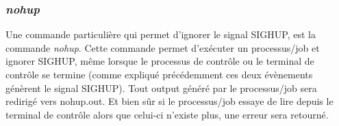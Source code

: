 \subsubsection{\textit{nohup}}
Une commande particulière qui permet d’ignorer le signal SIGHUP, est la commande \textit{nohup}. Cette commande permet d’exécuter un processus/job et ignorer SIGHUP, même lorsque le processus de contrôle ou le terminal de contrôle se termine (comme expliqué précédemment ces deux évènements génèrent le signal SIGHUP). Tout output généré par le processus/job sera redirigé vers nohup.out. Et bien sûr si le processus/job essaye de lire depuis le terminal de contrôle alors que celui-ci n’existe plus, une erreur sera retourné.